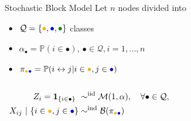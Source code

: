 \documentclass[nopagenumber,9pt]{beamer}
\begin{document}
\begin{frame}
\begin{center}
\begin{overlayarea}{\textwidth}{.5\textheight}
\begin{columns}
\begin{column}{.45\paperwidth}
        \end{column}
        \begin{column}{.5\paperwidth}
          \begin{small}
            \begin{block}{Stochastic Block Model}
              Let $n$ nodes divided into
              \begin{itemize}
              \item
                $\mathcal{Q}=\{\textcolor{yellow!40!orange}{\bullet},\textcolor{blue!80!black}{\bullet},\textcolor{green!50!black}{\bullet}\}$
                classes
              \item  $\alpha_\bullet  =  \mathbb{P}(i  \in  \bullet)$,
                $\bullet\in\mathcal{Q},i=1,\dots,n$
              \item      $\pi_{\textcolor{yellow!40!orange}{\bullet}\textcolor{blue!80!black}{\bullet}}     =      \mathbb{P}(i
                \leftrightarrow j | i\in\textcolor{yellow!40!orange}{\bullet},j\in\textcolor{blue!80!black}{\bullet})$
              \end{itemize}
            \end{block}
          \end{small}
        \end{column}
      \end{columns}
    \end{overlayarea}
  \end{center}
  

\begin{align*}
Z_i = \mathbf{1}_{\{i \in \bullet\}}  \ & \sim^{\text{iid}} \mathcal{M}(1,\alpha), \quad \forall\bullet \in \mathcal{Q}, \\ 
X_{ij} \ | \ \{i\in\textcolor{yellow!40!orange}{\bullet},j\in\textcolor{blue!80!black}{\bullet}\}
& \sim^{\text{ind}} \mathcal{B}(\pi_{\textcolor{yellow!40!orange}{\bullet}\textcolor{blue!80!black}{\bullet}})\\
\end{align*}


\end{frame}
\end{document}
